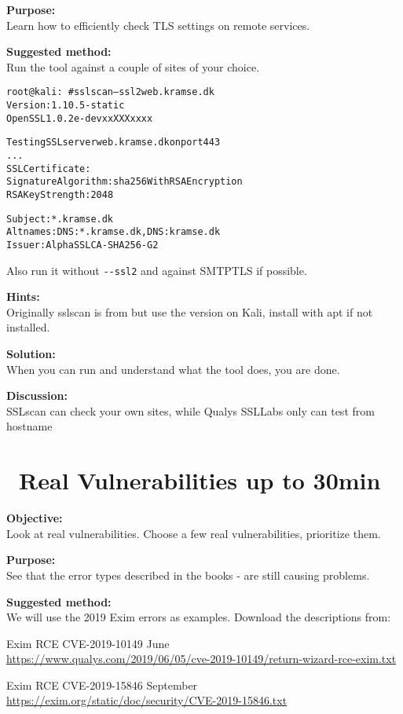 \documentclass[a4paper,11pt,notitlepage]{report}
\begin{document}
{\bf Purpose:}\\
Learn how to efficiently check TLS settings on remote services.

{\bf Suggested method:}\\
Run the tool against a couple of sites of your choice.

\begin{alltt}\small
root@kali:~# sslscan --ssl2 web.kramse.dk
Version: 1.10.5-static
OpenSSL 1.0.2e-dev xx XXX xxxx

Testing SSL server web.kramse.dk on port 443
...
  SSL Certificate:
Signature Algorithm: sha256WithRSAEncryption
RSA Key Strength:    2048

Subject:  *.kramse.dk
Altnames: DNS:*.kramse.dk, DNS:kramse.dk
Issuer:   AlphaSSL CA - SHA256 - G2
\end{alltt}

Also run it without \verb+--ssl2+ and against SMTPTLS if possible.

{\bf Hints:}\\
Originally sslscan is from  but use the version on Kali, install with apt if not installed.

{\bf Solution:}\\
When you can run and understand what the tool does, you are done.

{\bf Discussion:}\\
SSLscan can check your own sites, while Qualys SSLLabs only can test from hostname


\chapter{\faExclamationTriangle\ Real Vulnerabilities up to 30min}
\label{ex:real-vulns}



{\bf Objective:}\\
Look at real vulnerabilities. Choose a few real vulnerabilities, prioritize them.

{\bf Purpose:}\\
See that the error types described in the books - are still causing problems.



{\bf Suggested method:}\\
We will use the 2019 Exim errors as examples. Download the descriptions from:
\begin{list2}
\item Exim RCE CVE-2019-10149 June\\ \url{https://www.qualys.com/2019/06/05/cve-2019-10149/return-wizard-rce-exim.txt}

\item Exim RCE CVE-2019-15846 September\\
\url{https://exim.org/static/doc/security/CVE-2019-15846.txt}
\end{list2}
\end{document}
